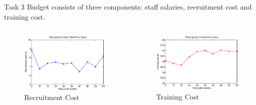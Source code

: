 \documentclass{beamer}
\begin{document}
\begin{frame}{Task 3}
Budget consists of three components: staff salaries, recruitment cost and training cost.
\begin{columns}
\begin{figure}
\centering
\includegraphics[width=1.0\textwidth]{fig/task-3-1.eps}
\caption{Recruitment Cost}
\end{figure}
\begin{figure}
\centering
\includegraphics[width=1.0\textwidth]{fig/task-3-2.eps}
\caption{Training Cost}
\end{figure}
\end{columns}

\end{frame}
\end{document}
